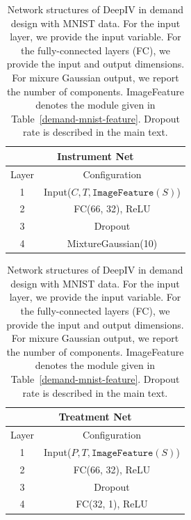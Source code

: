 \begingroup
\renewcommand{\arraystretch}{1.2}
\begin{table}[t]
    \caption{Network structures of DeepIV in demand design with MNIST data.  For the input layer, we provide the input variable. For the fully-connected layers (FC), we provide the input and output dimensions. For mixure Gaussian output, we report the number of components. ImageFeature denotes the module given in Table~\ref{demand-mnist-feature}. Dropout rate is described in the main text. }
    
    \label{deepiv-demand-network-mnist}
    \centering
    
    \begin{minipage}{0.48\hsize}
        \centering
        \begin{tabular}{cc}
            \multicolumn{2}{c}{\bf Instrument Net} 
            \\ \hline
            Layer & Configuration \\ \hline
            1 & Input($C, T, \mathtt{Image Feature}(S)$) \\ \hline
            2 & FC(66, 32), ReLU \\ \hline
            3 & Dropout \\ \hline
            4 & MixtureGaussian(10) \\ \hline
            \end{tabular}    
    \end{minipage}
    \hfill
    \begin{minipage}{0.48\hsize}
        \centering
        \begin{tabular}{cc}
            \multicolumn{2}{c}{\bf Treatment Net} 
            \\ \hline
            Layer & Configuration \\ \hline
            1 & Input($P, T, \mathtt{Image Feature}(S)$) \\ \hline
            2 & FC(66, 32), ReLU \\ \hline
            3 & Dropout \\ \hline
            4 & FC(32, 1), ReLU \\ \hline
            \end{tabular}    
    \end{minipage}
    
\end{table}
\endgroup  


